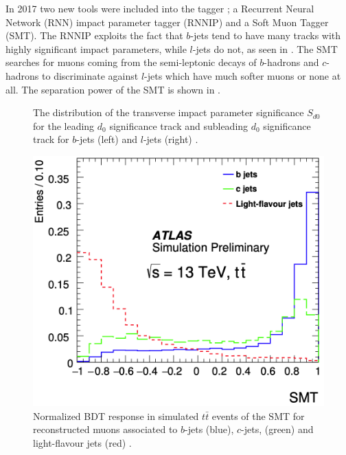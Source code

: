 In 2017 two new tools were included into the tagger
\cite{ATL-PHYS-PUB-2017-013}; a Recurrent Neural Network (RNN) impact parameter
tagger (RNNIP) and a Soft Muon Tagger (SMT).  The RNNIP
\cite{ATL-PHYS-PUB-2017-003} exploits the fact that $b$-jets tend to have many
tracks with highly significant impact parameters, while $l$-jets do not, as
seen in .  The SMT \cite{Sciandra:2287545} searches for
muons coming from the semi-leptonic decays of $b$-hadrons and $c$-hadrons to
discriminate against $l$-jets which have much softer muons or none at all. The
separation power of the SMT is shown in .

\begin{figure}[!htbp]
  \centering
   \hfill

  \caption{The distribution of the transverse impact parameter significance $S_{d0}$ for the leading $d_{0}$ significance track and subleading $d_{0}$ significance track for $b$-jets (left) and $l$-jets (right) \cite{Chisholm:bjet}.}
  \label{sec:objects:RNNIP}
\end{figure}

\begin{figure}[!htbp]
  \centering
  \includegraphics[width=0.5\linewidth]{figures/objects/SMT}
  \caption{Normalized BDT response in simulated $t\bar{t}$ events of the SMT for reconstructed muons associated to $b$-jets (blue), $c$-jets, (green) and light-flavour jets (red) \cite{Chisholm:bjet}.}
  \label{sec:objects:SMT}
\end{figure}

